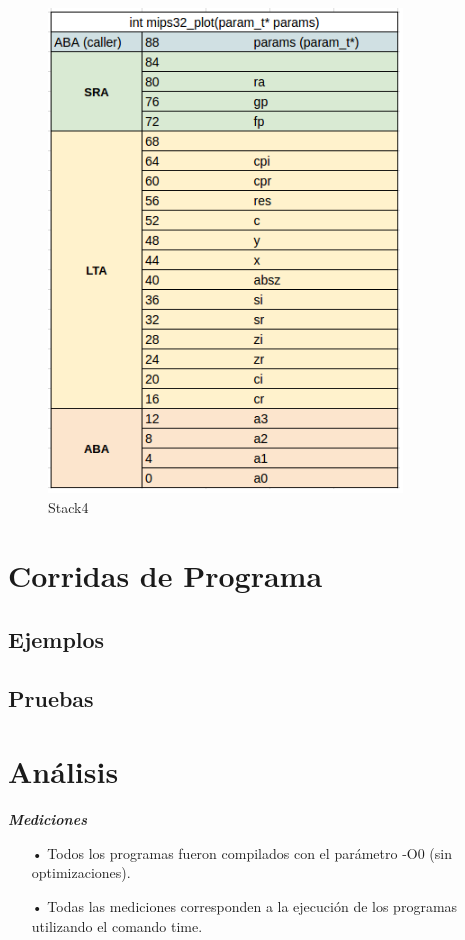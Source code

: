 \documentclass{article}
\begin{document}
\begin{figure}[H]
	\centering
		\includegraphics[scale=0.4]{stack4.png}
	\caption{Stack4}
	\label{fig:stack4}
\end{figure}


\section{Corridas de Programa}

\subsection{Ejemplos}

\subsection{Pruebas}

\clearpage

\section{Análisis}

\textbf{\textit{Mediciones}}

\begin{itemize}
\item[•] Todos los programas fueron compilados con el parámetro -O0 (sin optimizaciones).\\
\item[•] Todas las mediciones corresponden a la ejecución de los programas utilizando el comando time.\\
\end{itemize}
\end{document}
